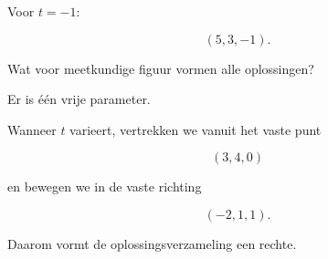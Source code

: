 \documentclass{ximera}
\begin{document}
\begin{oefening}{\oefU\ESS}
\begin{question}
\begin{oplossing}
Voor \(t=-1\):

\[
(5,3,-1).
\]

\end{oplossing}

\end{question}


\begin{question}

Wat voor meetkundige figuur vormen alle oplossingen?

\begin{multipleChoice}
\end{multipleChoice}

\begin{oplossing}

Er is één vrije parameter.

Wanneer \(t\) varieert, vertrekken we vanuit het vaste punt

\[
(3,4,0)
\]

en bewegen we in de vaste richting

\[
(-2,1,1).
\]

Daarom vormt de oplossingsverzameling een rechte.

\end{oplossing}

\end{question}

\end{oefening}



\end{document}
